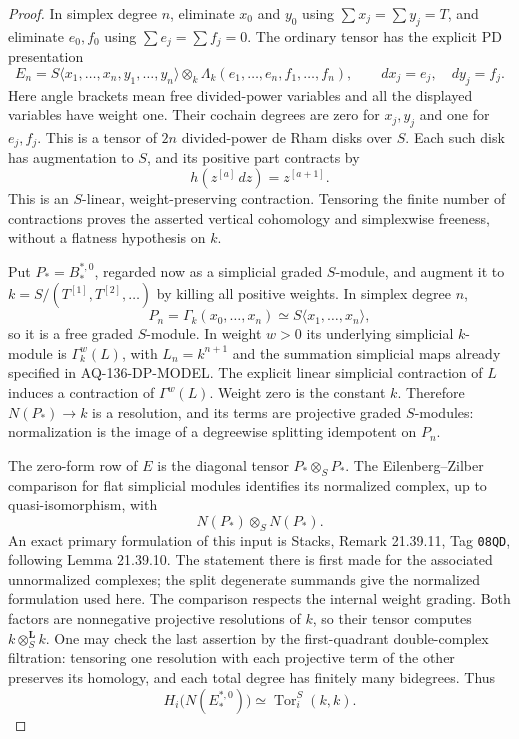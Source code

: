\documentclass[11pt,a4paper]{article}
\theoremstyle{definition}\newtheorem{definition}[theorem]{Definition}
\theoremstyle{remark}\newtheorem{remark}[theorem]{Remark}
\begin{document}
\begin{proof}
In simplex degree $n$, eliminate $x_0$ and $y_0$ using
$\sum x_j=\sum y_j=T$, and eliminate $e_0,f_0$ using
$\sum e_j=\sum f_j=0$. The ordinary tensor has the explicit
PD presentation
\[
 E_n=S\langle x_1,\ldots,x_n,y_1,\ldots,y_n\rangle
       \otimes_k\Lambda_k(e_1,\ldots,e_n,f_1,\ldots,f_n),
 \qquad dx_j=e_j,\quad dy_j=f_j.
\]
Here angle brackets mean free divided-power variables and
all the displayed variables have weight one. Their cochain
degrees are zero for $x_j,y_j$ and one for $e_j,f_j$.
This is a tensor of $2n$ divided-power de Rham disks over $S$.
Each such disk has augmentation to $S$, and its positive
part contracts by
\[
                    h(z^{[a]}\,dz)=z^{[a+1]}.
\]
This is an $S$-linear, weight-preserving contraction.
Tensoring the finite number of contractions proves the
asserted vertical cohomology and simplexwise freeness,
without a flatness hypothesis on $k$.

Put $P_*=B_*^{*,0}$, regarded now as a simplicial graded
$S$-module, and augment it to $k=S/(T^{[1]},T^{[2]},\ldots)$
by killing all positive weights. In simplex degree $n$,
\[
 P_n=\Gamma_k(x_0,\ldots,x_n)
       \simeq S\langle x_1,\ldots,x_n\rangle,
\]
so it is a free graded $S$-module. In weight $w>0$ its
underlying simplicial $k$-module is $\Gamma^w_k(L)$, with
$L_n=k^{n+1}$ and the summation simplicial maps already
specified in AQ-136-DP-MODEL. The explicit linear simplicial
contraction of $L$ induces a contraction of $\Gamma^w(L)$.
Weight zero is the constant $k$. Therefore $N(P_*)\to k$
is a resolution, and its terms are projective graded
$S$-modules: normalization is the image of a degreewise
splitting idempotent on $P_n$.

The zero-form row of $E$ is the diagonal tensor $P_*\otimes_S P_*$.
The Eilenberg--Zilber comparison for flat simplicial modules
identifies its normalized complex, up to quasi-isomorphism,
with
\[
                  N(P_*)\otimes_S N(P_*).
\]
An exact primary formulation of this input is Stacks,
Remark 21.39.11, Tag \nolinkurl{08QD}, following
Lemma 21.39.10. The statement there is first made for the
associated unnormalized complexes; the split degenerate
summands give the normalized formulation used here.
The comparison respects the internal weight grading.
Both factors are nonnegative projective resolutions of
$k$, so their tensor computes $k\otimes_S^{\mathbf L}k$.
One may check the last assertion by the first-quadrant
double-complex filtration: tensoring one resolution with
each projective term of the other preserves its homology,
and each total degree has finitely many bidegrees. Thus
\[
 H_i\bigl(N(E^{*,0}_*)\bigr)
                         \simeq\operatorname{Tor}_i^S(k,k).
                                                               \tag{136.T2}
\]


\end{proof}
\end{document}
